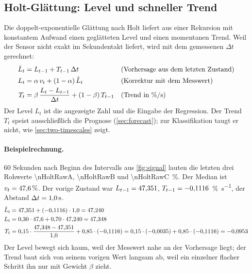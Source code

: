 \documentclass[11pt,a4paper]{article}
\newcommand{\pers}{\si{\percent\per\second}}
\begin{document}
\subsection{Holt-Glättung: Level und schneller Trend}

Die doppelt-exponentielle Glättung nach Holt liefert aus einer Rekursion mit
konstantem Aufwand einen geglätteten Level und einen momentanen Trend. Weil der
Sensor nicht exakt im Sekundentakt liefert, wird mit dem gemessenen $\Delta t$
gerechnet:
\begin{align}
  \hat L_t &= L_{t-1} + T_{t-1}\,\Delta t
    && \text{(Vorhersage aus dem letzten Zustand)} \label{eq:holt-fc}\\
  L_t &= \alpha\, v_t + (1-\alpha)\,\hat L_t
    && \text{(Korrektur mit dem Messwert)} \label{eq:holt-level}\\
  T_t &= \beta\,\frac{L_t - L_{t-1}}{\Delta t} + (1-\beta)\,T_{t-1}
    && \text{(Trend in \pers)} \label{eq:holt-trend}
\end{align}
Der Level $L_t$ ist die angezeigte Zahl und die Eingabe der Regression. Der
Trend $T_t$ speist ausschließlich die Prognose (\cref{sec:forecast}); zur
Klassifikation taugt er nicht, wie \cref{sec:two-timescales} zeigt.

\paragraph{Beispielrechnung.}
60 Sekunden nach Beginn des Intervalls aus \cref{fig:signal} lauten die letzten
drei Rohwerte \num{\nHoltRawA}, \num{\nHoltRawB} und \SI{\nHoltRawC}{\percent}.
Der Median ist $v_t = \SI{47.6}{\percent}$. Der vorige Zustand war
$L_{t-1} = \num{47.351}$, $T_{t-1} = \num{-0.1116}$~\pers, der
Abstand $\Delta t = \SI{1.0}{\second}$.
\begin{align*}
  \hat L_t &= \num{47.351} + (\num{-0.1116}) \cdot \num{1.0}
           = \num{47.240} \\
  L_t &= \num{0.30} \cdot \num{47.6} + \num{0.70} \cdot \num{47.240}
      = \num{47.348} \\
  T_t &= \num{0.15} \cdot \frac{\num{47.348} - \num{47.351}}{\num{1.0}}
        + \num{0.85} \cdot (\num{-0.1116})
      = \num{0.15} \cdot (\num{-0.0035}) + \num{0.85} \cdot (\num{-0.1116})
      = \num{-0.0953}
\end{align*}
Der Level bewegt sich kaum, weil der Messwert nahe an der Vorhersage liegt;
der Trend baut sich von seinem vorigen Wert langsam ab, weil ein einzelner
flacher Schritt ihn nur mit Gewicht $\beta$ zieht.
\end{document}
